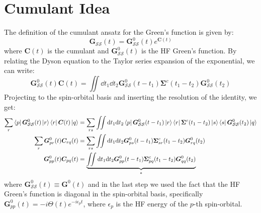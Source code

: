 \section{Cumulant Idea}
The definition of the cumulant ansatz for the Green's function is given by:
\begin{equation}
    \bm{G}_{\mathcal{SS}}(t) = \bm{G}_{\mathcal{SS}}^0(t)e^{\bm{C}(t)}
\end{equation}
where $\bm{C}(t)$ is the cumulant and $\bm{G}_{\mathcal{SS}}^0(t)$ is the HF Green's function. By relating the Dyson equation to the Taylor series expansion of the exponential, we can write:
\begin{equation}
    \bm{G}_{\mathcal{SS}}^0(t) \bm{C}(t) = \iint \dd t_1 \dd t_2 \bm{G}_{\mathcal{SS}}^0(t-t_1) \bm{\Sigma}^c(t_1 - t_2) \bm{G}_{\mathcal{SS}}^0(t_2)
\end{equation}
Projecting to the spin-orbital basis and inserting the resolution of the identity, we get:
\begin{align}
    \sum_{r}\bra{p}\bm{G}_{\mathcal{SS}}^0(t) \ket{r}\bra{r}\bm{C}(t)\ket{q} &= \sum_{rs}\iint \dd t_1 \dd t_2 \bra{p}\bm{G}_{\mathcal{SS}}^0(t-t_1)\ket{r} \bra{r}\bm{\Sigma}^c(t_1 - t_2)\ket{s} \bra{s}\bm{G}_{\mathcal{SS}}^0(t_2)\ket{q} \\
    \sum_{r}\bm{G}_{pr}^0(t) \bm{C}_{rq}(t) &= \sum_{rs}\iint \dd t_1 \dd t_2 \bm{G}_{ps}^0(t-t_1) \bm{\Sigma}_{sr}^c(t_1 - t_2) \bm{G}_{rq}^0(t_2)\\
    \bm{G}_{pp}^{0}(t) \bm{C}_{pq}(t) &= \underbrace{\iint \dd t_1 \dd t_2 \bm{G}_{pp}^{0}(t-t_1) \bm{\Sigma}_{pq}^c(t_1 - t_2) \bm{G}_{qq}^{0}(t_2)}_{*}
    \label{eqn:cumulant_connection}
\end{align}
where $\bm{G}_{\mathcal{SS}}^0(t)\equiv \bm{G}^0(t)$ and in the last step we used the fact that the HF Green's function is diagonal in the spin-orbital basis, specifically $\bm{G}_{pp}^{0}(t) = -i\Theta(t)e^{-i\epsilon_p t}$, where $\epsilon_p$ is the HF energy of the $p$-th spin-orbital.
